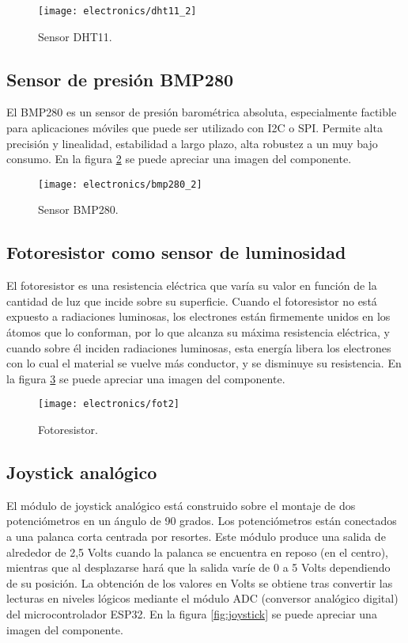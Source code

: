 \begin{figure}[h]
    \centering
    \texttt{[image: electronics/dht11\_2]}
    \caption{Sensor DHT11.}
    \label{fig:dht11}
\end{figure}

\subsection{Sensor de presión BMP280}

El BMP280 \cite{BMP280_datasheet} es un sensor de presión barométrica absoluta, especialmente factible para aplicaciones móviles que puede ser utilizado con I2C o SPI. Permite alta precisión y linealidad, estabilidad a largo plazo, alta robustez a un muy bajo consumo. En la figura \ref{fig:bmp280} se puede apreciar una imagen del componente.

\begin{figure}[h]
    \centering
    \texttt{[image: electronics/bmp280\_2]}
    \caption{Sensor BMP280.}
    \label{fig:bmp280}
\end{figure}

\subsection{Fotoresistor como sensor de luminosidad}

El fotoresistor es una resistencia eléctrica que varía su valor en función de la cantidad de luz que incide sobre su superficie. 
Cuando el fotoresistor no está expuesto a radiaciones luminosas, los electrones están firmemente unidos en los átomos que lo conforman, por lo que alcanza su máxima resistencia eléctrica, y cuando sobre él inciden radiaciones luminosas, esta energía libera los electrones con lo cual el material se vuelve más conductor, y se disminuye su resistencia. En la figura \ref{fig:fotoresistor} se puede apreciar una imagen del componente.

\begin{figure}[h]
    \centering
    \texttt{[image: electronics/fot2]}
    \caption{Fotoresistor.}
    \label{fig:fotoresistor}
\end{figure}

\subsection{Joystick analógico}
 
El módulo de joystick analógico \cite{analog_joystick_datasheet} está construido sobre el montaje de dos potenciómetros en un ángulo de 90 grados. Los potenciómetros están conectados a una palanca corta centrada por resortes. 
Este módulo produce una salida de alrededor de 2,5 Volts cuando la palanca se encuentra en reposo (en el centro), mientras que al desplazarse hará que la salida varíe de 0 a 5 Volts dependiendo de su posición. La obtención de los valores en Volts se obtiene tras convertir las lecturas en niveles lógicos mediante el módulo ADC (conversor analógico digital) \cite{ESP32_adc} del microcontrolador ESP32. En la figura \ref{fig:joystick} se puede apreciar una imagen del componente.

